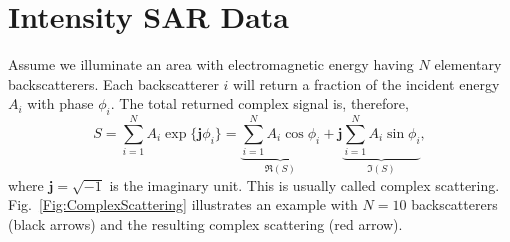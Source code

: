 \documentclass{beamer}
\begin{document}
\section{Intensity SAR Data}

\begin{frame}
Assume we illuminate an area with electromagnetic energy having $N$ elementary backscatterers.
Each backscatterer $i$ will return a fraction of the incident energy $A_i$ with phase $\phi_i$.
The total returned complex signal is, therefore,
\begin{equation}
S = \sum_{i=1}^{N} A_i \exp\{\mathbf j \phi_i\} = 
\underbrace{{\sum_{i=1}^{N} A_i \cos \phi_i}}_{\Re(S)} +\mathbf j \underbrace{ \sum_{i=1}^{N} A_i \sin \phi_i}_{\Im(S)}, 
\label{Eq:ComplexBackscatter}
\end{equation}
where $\mathbf j=\sqrt{-1}$ is the imaginary unit.
This is usually called complex scattering.
Fig.~\ref{Fig:ComplexScattering} illustrates an example with $N=10$ backscatterers (black arrows) and the resulting complex scattering (red arrow).
\end{frame}
\end{document}
